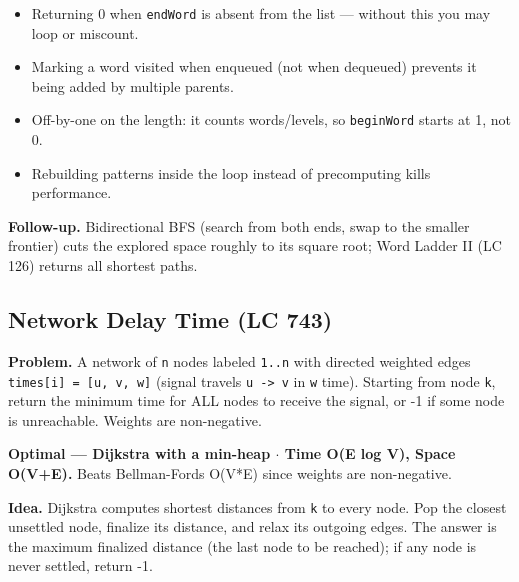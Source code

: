 \documentclass[11pt]{article}
\providecommand{\tightlist}{\setlength{\itemsep}{1pt}\setlength{\parskip}{0pt}}
\begin{document}
\begin{itemize}
\tightlist
\item
  Returning 0 when \texttt{endWord} is absent from the list --- without this you may loop or miscount.
\item
  Marking a word visited when enqueued (not when dequeued) prevents it being added by multiple parents.
\item
  Off-by-one on the length: it counts words/levels, so \texttt{beginWord} starts at 1, not 0.
\item
  Rebuilding patterns inside the loop instead of precomputing kills performance.
\end{itemize}

\textbf{Follow-up.} Bidirectional BFS (search from both ends, swap to the smaller frontier) cuts the explored space roughly to its square root; Word Ladder II (LC 126) returns all shortest paths.

\subsection{Network Delay Time (LC 743)}\label{network-delay-time-lc-743}

\textbf{Problem.} A network of \texttt{n} nodes labeled \texttt{1..n} with directed weighted edges \texttt{times{[}i{]}\ =\ {[}u,\ v,\ w{]}} (signal travels \texttt{u\ -\textgreater{}\ v} in \texttt{w} time). Starting from node \texttt{k}, return the minimum time for ALL nodes to receive the signal, or -1 if some node is unreachable. Weights are non-negative.

\textbf{Optimal --- Dijkstra with a min-heap \(\cdot\) Time O(E log V), Space O(V+E).} Beats Bellman-Ford\textquotesingle s O(V*E) since weights are non-negative.

\textbf{Idea.} Dijkstra computes shortest distances from \texttt{k} to every node. Pop the closest unsettled node, finalize its distance, and relax its outgoing edges. The answer is the maximum finalized distance (the last node to be reached); if any node is never settled, return -1.

\end{document}
